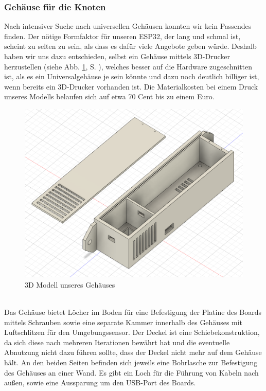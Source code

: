 \documentclass[a4paper,10pt,twocolumn]{article}
\begin{document}
\subsubsection{Gehäuse für die Knoten}
Nach intensiver Suche nach universellen Gehäusen konnten wir kein Passendes finden. Der nötige Formfaktor für unseren ESP32, der lang und schmal ist, scheint zu selten zu sein, als dass es dafür viele Angebote geben würde. Deshalb haben wir uns dazu entschieden, selbst ein Gehäuse mittels 3D-Drucker herzustellen (siehe Abb. \ref{fig:3d_case_model}, S. \pageref{fig:3d_case_model}), welches besser auf die Hardware zugeschnitten ist, als es ein Universalgehäuse je sein könnte und dazu noch deutlich billiger ist, wenn bereits ein 3D-Drucker vorhanden ist. Die Materialkosten bei einem Druck unseres Modells belaufen sich auf etwa 70 Cent bis zu einem Euro.\\
\begin{figure}[htb!]
\centering
\includegraphics[width = (\textwidth)/2]{images/3d_case_model.png}
\caption{3D Modell unseres Gehäuses}
\label{fig:3d_case_model}
\end{figure}\\
Das Gehäuse bietet Löcher im Boden für eine Befestigung der Platine des Boards mittels Schrauben sowie eine separate Kammer innerhalb des Gehäuses mit Luftschlitzen für den Umgebungssensor. Der Deckel ist eine Schiebekonstruktion, da sich diese nach mehreren Iterationen bewährt hat und die eventuelle Abnutzung nicht dazu führen sollte, dass der Deckel nicht mehr auf dem Gehäuse hält. An den beiden Seiten befinden sich jeweils eine Bohrlasche zur Befestigung des Gehäuses an einer Wand. Es gibt ein Loch für die Führung von Kabeln nach außen, sowie eine Aussparung um den USB-Port des Boards.
\end{document}
